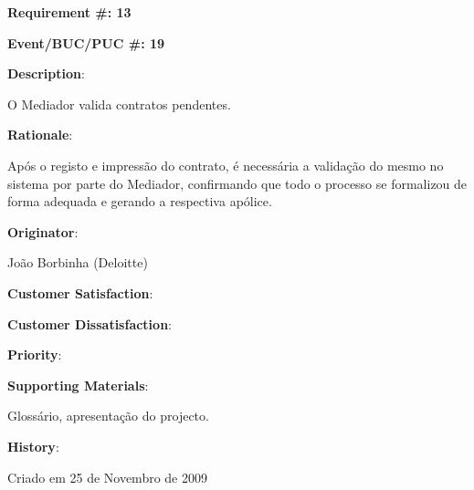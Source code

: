 \pagebreak

\begin{minipage}{0.55\textwidth}
\begin{flushleft}\textbf{Requirement \#: 13}\end{flushleft}
\end{minipage}
\begin{minipage}{0.4\textwidth}
\begin{flushright}\textbf{Event/BUC/PUC \#: 19}\end{flushright}
\end{minipage}

\begin{description}
\item \textbf{Description}:

O Mediador valida contratos pendentes.\\

\item \textbf{Rationale}:

Após o registo e impressão do contrato, é necessária a validação do mesmo no sistema por parte do Mediador, confirmando que todo o processo se formalizou de forma adequada e gerando a respectiva apólice.\\

\item \textbf{Originator}:

João Borbinha (Deloitte)\\

\begin{minipage}{0.45\textwidth}
\begin{flushleft}\item \textbf{Customer Satisfaction}:\end{flushleft}
\end{minipage}
\begin{minipage}{0.45\textwidth}
\begin{flushleft}\item \textbf{Customer Dissatisfaction}:\end{flushleft}
\end{minipage}

\item \textbf{Priority}:\\

\item \textbf{Supporting Materials}:

Glossário, apresentação do projecto.\\

\item \textbf{History}:

Criado em 25 de Novembro de 2009\\
\end{description}

